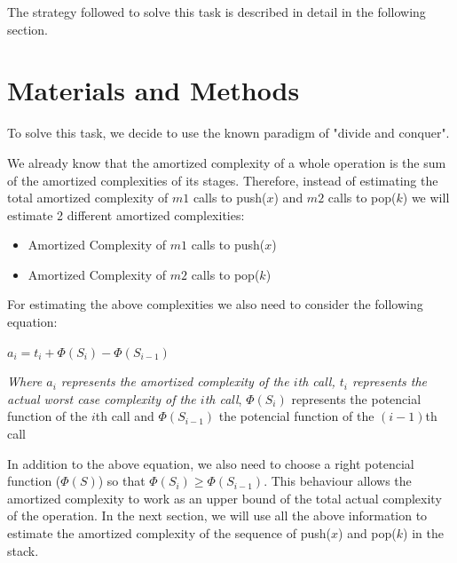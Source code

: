 \documentclass[12p]{report}
\begin{document}
\bigskip

The strategy followed to solve this task is described in detail in the following section.

 
  \section{Materials and Methods}			%

To solve this task, we decide to use the known paradigm of "divide and conquer". 

\bigskip

We already know that the amortized complexity of a whole operation is the sum of the amortized complexities of its stages. Therefore, instead of estimating the total amortized complexity of $m1$ calls to push($x$) and $m2$ calls to pop($k$) we will estimate 2 different amortized complexities:
\begin{itemize}
 \item Amortized Complexity of $m1$ calls to push($x$)
 \item Amortized Complexity of $m2$ calls to pop($k$)
\end{itemize}

\bigskip

For estimating the above complexities we also need to consider the following equation:

\bigskip

\begin{center}
\Large
$a_{i} = t_{i} + \Phi(S_{i}) - \Phi(S_{i-1}) $
\end{center}

\large

\textit{Where $a_{i}$ represents the amortized complexity of the $i$th call, $t_{i}$ represents the actual worst case complexity of the $i$th call}, $\Phi(S_{i})$ represents the potencial function of the $i$th call and $\Phi(S_{i-1})$ the potencial function of the $(i-1)$th call

\bigskip

In addition to the above equation, we also need to choose a right potencial function ($\Phi(S)$) so that $\Phi(S_{i}) \geq \Phi(S_{i-1})$. This behaviour allows the amortized complexity to work as an upper bound of the total actual complexity of the operation. In the next section, we will use all the above information to estimate the amortized complexity of the sequence of push($x$) and pop($k$) in the stack.
\end{document}
